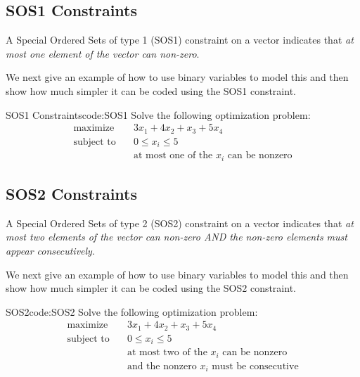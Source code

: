 \documentclass[../open-optimization/open-optimization.tex]{subfiles}
\begin{document}
\subsection{SOS1 Constraints}
\begin{definition}
A Special Ordered Sets of type 1 (SOS1) constraint on a vector indicates that \emph{at most one element of the vector can non-zero}.
\end{definition}
We next give an example of how to use binary variables to model this and then show how much simpler it can be coded using the SOS1 constraint.

\begin{examplewithcode}{SOS1 Constraints}{code:SOS1}
\label{example:sos1}
Solve the following optimization problem: \[\begin{aligned}
\text{maximize}\quad & 3x_1 + 4x_2 + x_3 + 5x_4 \\
\text{subject to}\quad & 0 \le x_i \le 5 \\
& \text{at most one of the $x_i$ can be nonzero}
\end{aligned}\]
\end{examplewithcode}
\subsection{SOS2 Constraints}
\begin{definition}
A Special Ordered Sets of type 2 (SOS2) constraint on a vector indicates that \emph{at most two elements of the vector can non-zero AND the non-zero elements must appear consecutively}.
\end{definition}
We next give an example of how to use binary variables to model this and then show how much simpler it can be coded using the SOS2 constraint.
\begin{examplewithcode}{SOS2}{code:SOS2}
\label{example:SOS2}
Solve the following optimization problem: \[\begin{aligned}
\text{maximize}\quad & 3x_1 + 4x_2 + x_3 + 5x_4 \\
\text{subject to}\quad & 0 \le x_i \le 5 \\
& \text{at most two of the $x_i$ can be nonzero} \\
& \text{and the nonzero $x_i$ must be consecutive}
\end{aligned}\]
\end{examplewithcode}
\end{document}
